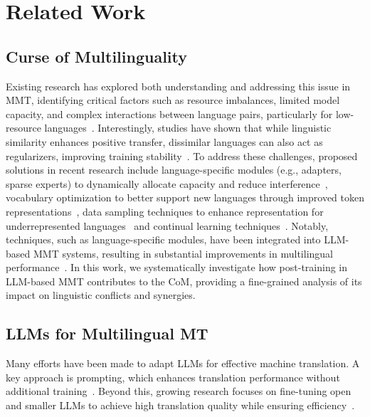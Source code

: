 \section{Related Work}
\subsection{Curse of Multilinguality}
Existing research has explored both understanding and addressing this issue in MMT, identifying critical factors such as resource imbalances, limited model capacity, and complex interactions between language pairs, particularly for low-resource languages~\cite{arivazhagan2019massively,aharoni-etal-2019-massively,shaham-etal-2023-causes}. Interestingly, studies have shown that while linguistic similarity enhances positive transfer, dissimilar languages can also act as regularizers, improving training stability~\cite{meng-monz-2024-disentangling}. 
To address these challenges, proposed solutions in recent research include language-specific modules (e.g., adapters, sparse experts) to dynamically allocate capacity and reduce interference~\cite{fan2021beyond,zhao2024sparse,xu-etal-2023-condensing}, vocabulary optimization to better support new languages through improved token representations~\cite{han2024adapters}, data sampling techniques to enhance representation for underrepresented languages~\cite{wang-etal-2020-balancing,wang-neubig-2019-target,lin-etal-2019-choosing} and continual learning techniques~\cite{liu-etal-2023-continual}. Notably, techniques, such as language-specific modules, have been integrated into LLM-based MMT systems, resulting in substantial improvements in multilingual performance~\cite{xu2024x}. In this work, we systematically investigate how post-training in LLM-based MMT contributes to the CoM, providing a fine-grained analysis of its impact on linguistic conflicts and synergies.
\subsection{LLMs for Multilingual MT}
Many efforts have been made to adapt LLMs for effective machine translation. A key approach is prompting, which enhances translation performance without additional training~\cite{he-etal-2024-exploring, lu-etal-2024-chain}. Beyond this, growing research focuses on fine-tuning open and smaller LLMs to achieve high translation quality while ensuring efficiency~\cite{xu2024a, yang2023bigtranslate, alves2024tower, aryabumi2024aya}.

